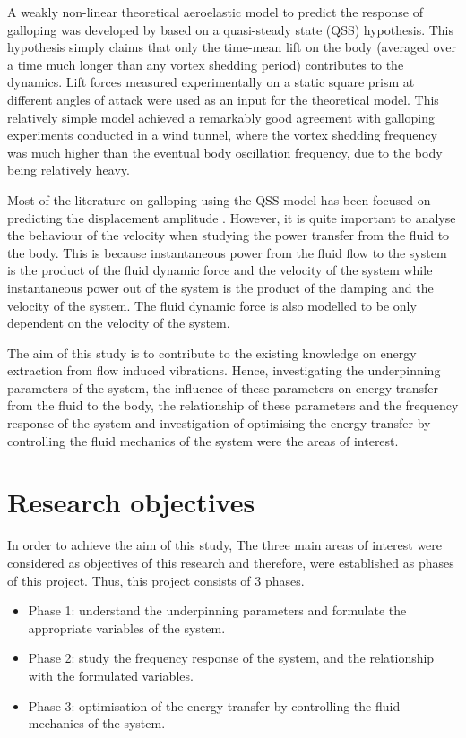 \documentclass[authoryear,12pt]{article}
\begin{document}
A weakly non-linear theoretical aeroelastic model to predict the response of galloping was developed by \citet{Parkinson1964} based on a quasi-steady state (QSS) hypothesis. This hypothesis simply claims that only the time-mean lift on the body (averaged over a time much longer than any vortex shedding period) contributes to the dynamics. Lift forces measured experimentally on a static square prism at different angles of attack were used as an input for the theoretical model. This relatively simple model achieved a remarkably good agreement with galloping experiments conducted in a wind tunnel, where the vortex shedding frequency was much higher than the eventual body oscillation frequency, due to the body being relatively heavy.

Most of the literature on galloping using the QSS model has been focused on predicting the displacement amplitude \citep{Parkinson1964,Joly2012,Luo2003}. However, it is quite important to analyse the behaviour of the velocity when studying the power transfer from the fluid to the body. This is because instantaneous power from the fluid flow to the system is the product of the fluid dynamic force and the velocity of the system while instantaneous power out of the system is the product of the damping and the velocity of the system. The fluid dynamic force is also modelled to be only dependent on the velocity of the system. 

The aim of this study is to contribute to the existing knowledge on energy extraction from flow induced vibrations. Hence, investigating the underpinning parameters of the system, the influence of these parameters on energy transfer from the fluid to the body, the relationship of these parameters and the frequency response of the system and investigation  of optimising the energy transfer by controlling the fluid mechanics of the system were the areas of interest.    

\section{Research objectives}

In order to achieve the aim of this study, The three main areas of interest were considered as objectives of this research and therefore, were established as phases of this project. Thus, this project consists of 3 phases. 

\begin{itemize}
\item  Phase 1: understand the underpinning parameters and formulate the appropriate variables of the system.
\item  Phase 2: study the frequency response of the system, and the relationship with the formulated variables.
\item  Phase 3: optimisation of the energy transfer by controlling the fluid mechanics of the system.
\end{itemize}   
\end{document}
